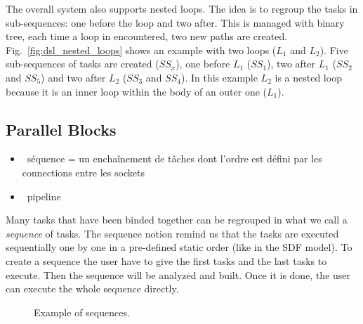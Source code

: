 The overall system also supports nested loops. The idea is to regroup the tasks
in sub-sequences: one before the loop and two after. This is managed with binary
tree, each time a loop in encountered, two new paths are created.
Fig.~\ref{fig:dsl_nested_loops} shows an example with two loops ($L_1$ and
$L_2$). Five sub-sequences of tasks are created ($SS_x$), one before $L_1$
($SS_1$), two after $L_1$ ($SS_2$ and $SS_5$) and two after $L_2$ ($SS_3$ and
$SS_4$). In this example $L_2$ is a nested loop because it is an inner loop
within the body of an outer one ($L_1$).

\subsection{Parallel Blocks}

\begin{itemize}
  \item \cmark~séquence = un enchaînement de tâches dont l'ordre est défini par les
    connections entre les sockets
  \item \cmark~pipeline
\end{itemize}

Many tasks that have been binded together can be regrouped in what we call a
\emph{sequence} of tasks. The sequence notion remind us that the tasks are
executed sequentially one by one in a pre-defined static order (like in the SDF
model). To create a sequence the user have to give the first tasks and the
last tasks to execute. Then the sequence will be analyzed and built. Once it is
done, the user can execute the whole sequence directly.

\begin{figure}[htp]
  \centering
  \quad
  \caption{Example of sequences.}
  \label{fig:dsl_sequence}
\end{figure}

